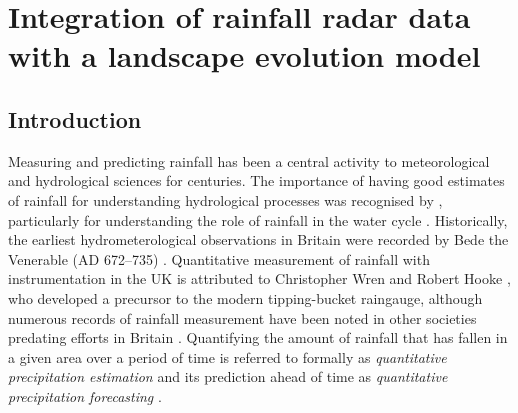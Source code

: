 \chapter{Integration of rainfall radar data with a landscape evolution model}
\label{chapter_metdata}

% 
%

\section{Introduction}

Measuring and predicting rainfall has been a central activity to meteorological and hydrological sciences for centuries. The importance of having good estimates of rainfall for understanding hydrological processes was recognised by \citet{perrault1674}, particularly for understanding the role of rainfall in the water cycle \citep{biswas1970history}. Historically, the earliest hydrometerological observations in Britain were recorded by Bede the Venerable (AD 672--735) \citep{mcculloch1993history}. Quantitative measurement of rainfall with instrumentation in the UK is attributed to Christopher Wren and Robert Hooke \citep{biswas1970history}, who developed a precursor to the modern tipping-bucket raingauge, although numerous records of rainfall measurement have been noted in other societies predating efforts in Britain \citep{strangeways2010history}. Quantifying the amount of rainfall that has fallen in a given area over a period of time is referred to formally as \textit{quantitative precipitation estimation} \citep{fabry2015radar} and its prediction ahead of time as \textit{quantitative precipitation forecasting} \citep{golding2000quantitative,browning2003quantitative}.


